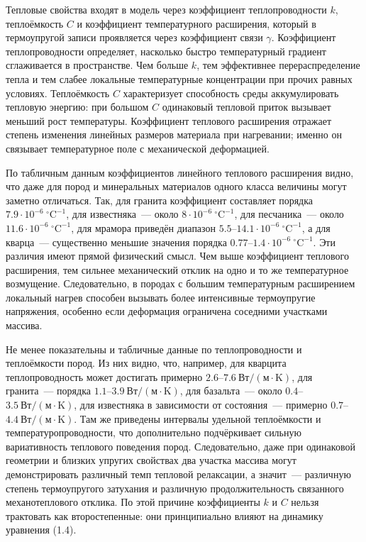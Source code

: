Тепловые свойства входят в модель через коэффициент теплопроводности $k$, теплоёмкость $C$ и коэффициент температурного расширения, который в термоупругой записи проявляется через коэффициент связи $\gamma$. Коэффициент теплопроводности определяет, насколько быстро температурный градиент сглаживается в пространстве. Чем больше $k$, тем эффективнее перераспределение тепла и тем слабее локальные температурные концентрации при прочих равных условиях. Теплоёмкость $C$ характеризует способность среды аккумулировать тепловую энергию: при большом $C$ одинаковый тепловой приток вызывает меньший рост температуры. Коэффициент теплового расширения отражает степень изменения линейных размеров материала при нагревании; именно он связывает температурное поле с механической деформацией.

По табличным данным коэффициентов линейного теплового расширения видно, что даже для пород и минеральных материалов одного класса величины могут заметно отличаться. Так, для гранита коэффициент составляет порядка $7.9\cdot 10^{-6}\ ^\circ\mathrm{C}^{-1}$, для известняка~--- около $8\cdot 10^{-6}\ ^\circ\mathrm{C}^{-1}$, для песчаника~--- около $11.6\cdot 10^{-6}\ ^\circ\mathrm{C}^{-1}$, для мрамора приведён диапазон $5.5$--$14.1\cdot 10^{-6}\ ^\circ\mathrm{C}^{-1}$, а для кварца~--- существенно меньшие значения порядка $0.77$--$1.4\cdot 10^{-6}\ ^\circ\mathrm{C}^{-1}$. Эти различия имеют прямой физический смысл. Чем выше коэффициент теплового расширения, тем сильнее механический отклик на одно и то же температурное возмущение. Следовательно, в породах с большим температурным расширением локальный нагрев способен вызывать более интенсивные термоупругие напряжения, особенно если деформация ограничена соседними участками массива.

Не менее показательны и табличные данные по теплопроводности и теплоёмкости пород. Из них видно, что, например, для кварцита теплопроводность может достигать примерно $2.6$--$7.6\ \mathrm{Вт/(м\cdot K)}$, для гранита~--- порядка $1.1$--$3.9\ \mathrm{Вт/(м\cdot K)}$, для базальта~--- около $0.4$--$3.5\ \mathrm{Вт/(м\cdot K)}$, для известняка в зависимости от состояния~--- примерно $0.7$--$4.4\ \mathrm{Вт/(м\cdot K)}$. Там же приведены интервалы удельной теплоёмкости и температуропроводности, что дополнительно подчёркивает сильную вариативность теплового поведения пород. Следовательно, даже при одинаковой геометрии и близких упругих свойствах два участка массива могут демонстрировать различный темп тепловой релаксации, а значит~--- различную степень термоупругого затухания и различную продолжительность связанного механотеплового отклика. По этой причине коэффициенты $k$ и $C$ нельзя трактовать как второстепенные: они принципиально влияют на динамику уравнения (1.4).

